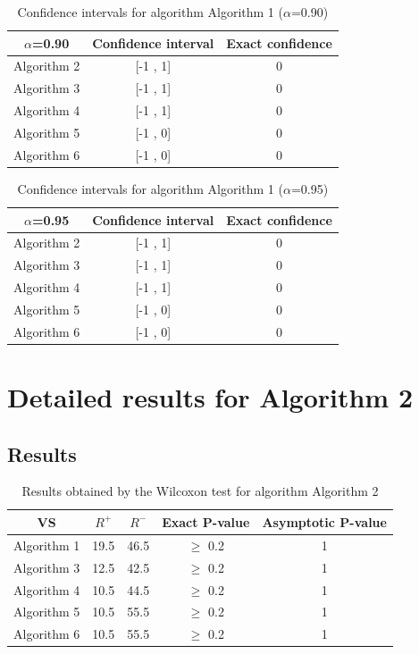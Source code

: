 \documentclass[a4paper,10pt]{article}
\begin{document}
\begin{table}[!htp]
\centering\small
\begin{tabular}{
|c|c|c|}
\hline
 $\alpha$=0.90 & Confidence interval & Exact confidence \\ \hline 
Algorithm 2 & [-1 , 1] & 0\\ \hline 
Algorithm 3 & [-1 , 1] & 0\\ \hline 
Algorithm 4 & [-1 , 1] & 0\\ \hline 
Algorithm 5 & [-1 , 0] & 0\\ \hline 
Algorithm 6 & [-1 , 0] & 0\\ \hline 

\end{tabular}
\caption{Confidence intervals for algorithm Algorithm 1 ($\alpha$=0.90)}
\end{table}
\begin{table}[!htp]
\centering\small
\begin{tabular}{
|c|c|c|}
\hline
 $\alpha$=0.95 & Confidence interval & Exact confidence \\ \hline 
Algorithm 2 & [-1 , 1] & 0\\ \hline 
Algorithm 3 & [-1 , 1] & 0\\ \hline 
Algorithm 4 & [-1 , 1] & 0\\ \hline 
Algorithm 5 & [-1 , 0] & 0\\ \hline 
Algorithm 6 & [-1 , 0] & 0\\ \hline 

\end{tabular}
\caption{Confidence intervals for algorithm Algorithm 1 ($\alpha$=0.95)}
\end{table}

 \clearpage 


\section{Detailed results for Algorithm 2}


\subsection{Results}

\begin{table}[!htp]
\centering\small
\begin{tabular}{
|c|c|c|c|c|}
\hline
 VS & $R^{+}$ & $R^{-}$ & Exact P-value & Asymptotic P-value \\ \hline 
Algorithm 1 & 19.5 & 46.5 & $\geq$ 0.2 & 1\\ \hline 
Algorithm 3 & 12.5 & 42.5 & $\geq$ 0.2 & 1\\ \hline 
Algorithm 4 & 10.5 & 44.5 & $\geq$ 0.2 & 1\\ \hline 
Algorithm 5 & 10.5 & 55.5 & $\geq$ 0.2 & 1\\ \hline 
Algorithm 6 & 10.5 & 55.5 & $\geq$ 0.2 & 1\\ \hline 

\end{tabular}
\caption{Results obtained by the Wilcoxon test for algorithm Algorithm 2}
\end{table}
\end{document}
